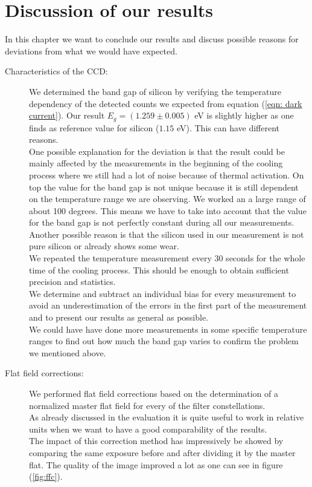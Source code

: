 \chapter{Discussion of our results}
In this chapter we want to conclude our results and discuss possible reasons for deviations from what we would have expected. \\
\begin{description}
	\item[Characteristics of the CCD:] We determined the band gap of silicon by verifying the temperature dependency of the detected counts we expected from equation (\ref{eqn: dark current}). Our result $E_g = (1.259 \pm 0.005)$ eV is slightly higher as one finds as reference value for silicon ($1.15$ eV). This can have different reasons. \\ One possible explanation for the deviation is that the  result could be mainly affected by the  measurements in the beginning  of the cooling process where we still had a lot of noise because of thermal activation. On top the value for the band gap is not unique because it is still dependent on the temperature range we are observing. We worked an a large range of about 100 degrees. This means we have to take into account that the value for the band gap is not perfectly constant during all our measurements. \\ Another possible reason is that the silicon  used in our measurement is not pure silicon or  already shows some wear. \\ We repeated the temperature measurement every 30 seconds for the whole time of the cooling process. This should be enough to obtain sufficient precision and statistics. \\
		We determine and subtract an individual bias for every measurement to avoid an underestimation of the errors in the first part of the measurement and to present our results as general as possible. \\
		 We could have have done more measurements in some specific temperature ranges to find out how much the band gap varies to confirm the problem we mentioned above. 
	\item[Flat field corrections:] We performed flat field corrections based on the determination of a normalized master flat field for every of the filter constellations. \\ As already discussed in the evaluation it is quite useful to work in relative units when we want to have a good comparability of the results.\\ The impact of this correction method has impressively be showed by comparing the same exposure before and after dividing it by the master flat. The quality of the image improved a lot as one can see in figure (\ref{fig:ffc}). \\

\end{description}
